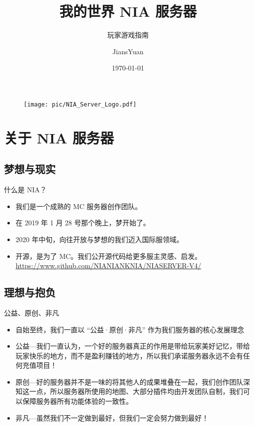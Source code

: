 \documentclass{beamer}
\author{\calligra JiansYuan}
\title{我的世界 NIA 服务器}
\subtitle{玩家游戏指南}
\institute{NIA Server Research \& Development Group}
\date{\today}
\begin{document}
\kaishu
\begin{frame} 
    \titlepage
    \begin{figure}[htpb]
        \begin{center}
            \texttt{[image: pic/NIA\_Server\_Logo.pdf]}
        \end{center} 
    \end{figure}
\end{frame}

\begin{frame}
    \tableofcontents[sectionstyle=show,subsectionstyle=show/shaded/hide,subsubsectionstyle=show/shaded/hide]
\end{frame}


\section{关于 NIA 服务器} 

\subsection{梦想与现实}
\begin{frame}{什么是 NIA？}
    \begin{itemize}[<+-| alert@+>]
        \item 我们是一个成熟的 MC 服务器创作团队。
        \item 在 2019 年 1 月 28 号那个晚上，梦开始了。
        \item 2020 年中旬，向往开放与梦想的我们迈入国际服领域。
        \item 开源，是为了 MC。\newline 我们公开源代码给更多服主灵感、启发。 \newline \url{https://www.github.com/NIANIANKNIA/NIASERVER-V4/} \\
    \end{itemize}
\end{frame}

\subsection{理想与抱负}
\begin{frame}{公益、原创、非凡}
    \begin{itemize}[<+-| alert@+>]
        \item 自始至终，我们一直以 “公益·原创·非凡” 作为我们服务器的核心发展理念
        \item 公益---我们一直认为，一个好的服务器真正的作用是带给玩家美好记忆，带给玩家快乐的地方，而不是盈利赚钱的地方，所以我们承诺服务器永远不会有任何充值项目！  
        \item 原创---好的服务器并不是一味的将其他人的成果堆叠在一起，我们创作团队深知这一点，所以服务器所使用的地图、大部分插件均由开发团队自制，我们可以保障服务器所有功能体验的一致性。
        \item 非凡---虽然我们不一定做到最好，但我们一定会努力做到最好！
    \end{itemize}
\end{frame}
\end{document}
